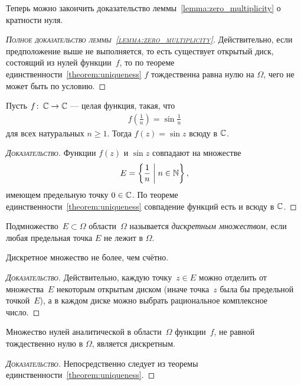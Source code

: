 \documentclass[../complex-analysis.tex]{subfiles}
\begin{document}
Теперь можно закончить доказательство леммы~\ref{lemma:zero_multiplicity} о кратности нуля.

\begin{proof}[\normalfont\textsc{Полное доказательство леммы~\ref{lemma:zero_multiplicity}}]
 Действительно, если предположение выше не выполняется, то есть существует открытый диск, состоящий из нулей функции~$ f $, то по теореме единственности~\ref{theorem:uniqueness} $ f $ тождественна равна нулю на $ \Omega $, чего не может быть по условию.
\end{proof}

\begin{exmpl}
 Пусть $ f\colon\,\mathbb{C}\to\mathbb{C} $ --- целая функция, такая, что
 \begin{align*}
  f \left( \frac{1}{n} \right) = \sin \frac{1}{n}
 \end{align*} для всех натуральных $ n \geqslant 1 $. Тогда $ f(z) = \sin z $ всюду в $ \mathbb{C} $.
\end{exmpl}
\begin{proof}[\normalfont\textsc{Доказательство}]
 Функции $ f(z) $ и $ \sin z $ совпадают на множестве
 \begin{align*}
  E = \left\{ \frac{1}{n} \;\middle|\; n \in \mathbb{N} \right\},
 \end{align*} имеющем предельную точку $ 0 \in \mathbb{C} $. По теореме единственности~\ref{theorem:uniqueness} совпадение функций есть и всюду в $ \mathbb{C} $.
\end{proof}

\begin{df}
 Подмножество~$ E \subset \Omega $ области~$ \Omega $ называется \emph{дискретным множеством}, если любая предельная точка $ E $ не лежит в $ \Omega $.
\end{df}
\begin{prop}
 \label{proposition:Discrete Set is Countable}
 Дискретное множество не более, чем счётно.
\end{prop}
\begin{proof}[\normalfont\textsc{Доказательство}]
 Действительно, каждую точку~$ z \in E $ можно отделить от множества~$ E $ некоторым открытым диском (иначе точка~$ z $ была бы предельной точкой~$ E $), а в каждом диске можно выбрать рациональное комплексное число.
\end{proof}

\begin{crly}
 \label{corollary:Zeroes of analytic fun is a Discrete Set}
 Множество нулей аналитической в области~$ \Omega $ функции~$ f $, не равной тождественно нулю в $ \Omega $, является дискретным.
\end{crly}
\begin{proof}[\normalfont\textsc{Доказательство}]
 Непосредственно следует из теоремы единственности~\ref{theorem:uniqueness}.
\end{proof}
\end{document}
